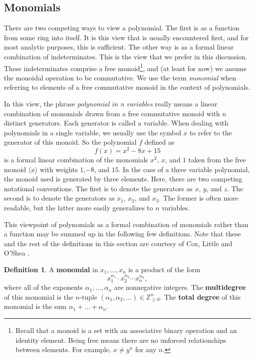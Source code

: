 \documentclass[MS, xcolor=dvipsnames]{wfuthesis}
\def\bZ{\mathbb{Z}}
\theoremstyle{definition}
\newtheorem{definition}[theorem]{Definition}
\begin{document}

\subsection{Monomials}
There are two competing ways to view a polynomial. The first is as a function from some ring into itself. It is this view that is usually encountered first, and for most analytic purposes, this is sufficient. The other way is as a formal linear combination of indeterminates. This is the view that we prefer in this discussion. These indeterminates comprise a free monoid\footnote{Recall that a monoid is a set with an associative binary operation and an identity element. Being free means there are no unforced relationships between elements. For example, $x \ne y^n$ for any $n$.}, and (at least for now) we assume the monoidal operation to be commutative. We use the term \textit{monomial} when referring to elements of a free commutative monoid in the context of polynomials. \par
In this view, the phrase \textit{polynomial in n variables} really means a linear combination of monomials drawn from a free commutative monoid with $n$ distinct generators. Each generator is called a variable. When dealing with polynomials in a single variable, we usually use the symbol $x$ to refer to the generator of this monoid. So the polynomial $f$ defined as
\[ f(x) = x^2-8x+15 \]
is a formal linear combination of the monomials $x^2$, $x$, and $1$ taken from the free monoid $\langle x \rangle$ with weights $1$,$-8$, and $15$. In the case of a three variable polynomial, the monoid used is generated by three elements. Here, there are two competing notational conventions. The first is to denote the generators as $x$, $y$, and $z$. The second is to denote the generators as $x_1$, $x_2$, and $x_3$. The former is often more readable, but the latter more easily generalizes to $n$ variables. \par
This viewpoint of polynomials as a formal combination of monomials rather than a function may be summed up in the following few definitions. Note that these and the rest of the definitions in this section are courtesy of Cox, Little and O'Shea \cite{Cox2015}.
\begin{definition}
  A \textbf{monomial} in $x_1,\dots,x_n$ is a product of the form
  \[ x_1^{\alpha_1} \cdot x_2^{\alpha_2} \cdots x_n^{\alpha_n}, \]
  where all of the exponents $\alpha_1,\dots,\alpha_n$ are nonnegative integers. The \textbf{multidegree} of this monomial is the $n$-tuple $(\alpha_1,\alpha_2,\dots) \in \bZ_{\ge0}^n$. The \textbf{total degree} of this monomial is the sum $\alpha_1 + \dots + \alpha_n$.
\end{definition}
\end{document}
